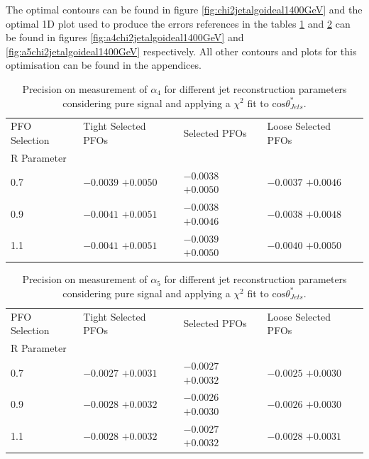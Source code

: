 The optimal contours can be found in figure \ref{fig:chi2jetalgoideal1400GeV} and the optimal 1D plot used to produce the errors references in the tables \ref{table:precisiona4signaljetalgo} and \ref{table:precisiona5signaljetalgo} can be found in figures \ref{fig:a4chi2jetalgoideal1400GeV} and \ref{fig:a5chi2jetalgoideal1400GeV} respectively.  All other contours and plots for this optimisation can be found in the appendices.  

\begin{table}[h!]
\centering
\begin{tabular}{l l l l}
\hline
PFO Selection & Tight Selected PFOs & Selected PFOs & Loose Selected PFOs \\ 
R Parameter & & & \\ 
\hline
0.7 & $-0.0039$ $+0.0050$ & $-0.0038$ $+0.0050$ & $-0.0037$ $+0.0046$ \\
0.9 & $-0.0041$ $+0.0051$ & $-0.0038$ $+0.0046$ & $-0.0038$ $+0.0048$ \\
1.1 & $-0.0041$ $+0.0051$ & $-0.0039$ $+0.0050$ & $-0.0040$ $+0.0050$ \\
\hline
\end{tabular}
\caption[$1\sigma$ precision on measurement of $\alpha_{4}$ for different jet reconstruction parameters considering pure signal.]{Precision on measurement of $\alpha_{4}$ for different jet reconstruction parameters considering pure signal and applying a $\chi^{2}$ fit to $\text{cos}\theta^{*}_{Jets}$.}
\label{table:precisiona4signaljetalgo}
\end{table}

\begin{table}[h!]
\centering
\begin{tabular}{l l l l}
\hline
PFO Selection & Tight Selected PFOs & Selected PFOs & Loose Selected PFOs \\ 
R Parameter & & & \\ 
\hline
0.7 & $-0.0027$ $+0.0031$ & $-0.0027$ $+0.0032$ & $-0.0025$ $+0.0030$ \\
0.9 & $-0.0028$ $+0.0032$ & $-0.0026$ $+0.0030$ & $-0.0026$ $+0.0030$ \\
1.1 & $-0.0028$ $+0.0032$ & $-0.0027$ $+0.0032$ & $-0.0028$ $+0.0031$ \\
\hline
\end{tabular}
\caption[$1\sigma$ precision on measurement of $\alpha_{5}$ for different jet reconstruction parameters considering pure signal.]{Precision on measurement of $\alpha_{5}$ for different jet reconstruction parameters considering pure signal and applying a $\chi^{2}$ fit to $\text{cos}\theta^{*}_{Jets}$.}
\label{table:precisiona5signaljetalgo}
\end{table}

